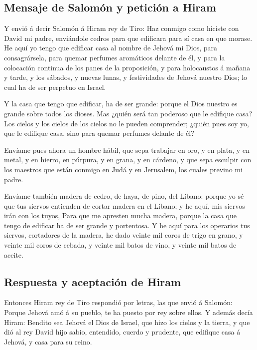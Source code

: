 \hypertarget{mensaje-de-salomuxf3n-y-peticiuxf3n-a-hiram}{%
\subsection{Mensaje de Salomón y petición a
Hiram}\label{mensaje-de-salomuxf3n-y-peticiuxf3n-a-hiram}}

 Y envió á decir Salomón á Hiram rey de Tiro: Haz conmigo
como hiciste con David mi padre, enviándole cedros para que edificara
para sí casa en que morase.  He aquí yo tengo que edificar
casa al nombre de Jehová mi Dios, para consagrársela, para quemar
perfumes aromáticos delante de él, y para la colocación continua de los
panes de la proposición, y para holocaustos á mañana y tarde, y los
sábados, y nuevas lunas, y festividades de Jehová nuestro Dios; lo cual
ha de ser perpetuo en Israel.

 Y la casa que tengo que edificar, ha de ser grande: porque
el Dios nuestro es grande sobre todos los dioses.  Mas
¿quién será tan poderoso que le edifique casa? Los cielos y los cielos
de los cielos no le pueden comprender; ¿quién pues soy yo, que le
edifique casa, sino para quemar perfumes delante de él?

 Envíame pues ahora un hombre hábil, que sepa trabajar en
oro, y en plata, y en metal, y en hierro, en púrpura, y en grana, y en
cárdeno, y que sepa esculpir con los maestros que están conmigo en Judá
y en Jerusalem, los cuales previno mi padre.

 Envíame también madera de cedro, de haya, de pino, del
Líbano: porque yo sé que tus siervos entienden de cortar madera en el
Líbano; y he aquí, mis siervos irán con los tuyos,  Para que
me apresten mucha madera, porque la casa que tengo de edificar ha de ser
grande y portentosa.  Y he aquí para los operarios tus
siervos, cortadores de la madera, he dado veinte mil coros de trigo en
grano, y veinte mil coros de cebada, y veinte mil batos de vino, y
veinte mil batos de aceite.

\hypertarget{respuesta-y-aceptaciuxf3n-de-hiram}{%
\subsection{Respuesta y aceptación de
Hiram}\label{respuesta-y-aceptaciuxf3n-de-hiram}}

 Entonces Hiram rey de Tiro respondió por letras, las que
envió á Salomón: Porque Jehová amó á su pueblo, te ha puesto por rey
sobre ellos.  Y además decía Hiram: Bendito sea Jehová el
Dios de Israel, que hizo los cielos y la tierra, y que dió al rey David
hijo sabio, entendido, cuerdo y prudente, que edifique casa á Jehová, y
casa para su reino.


